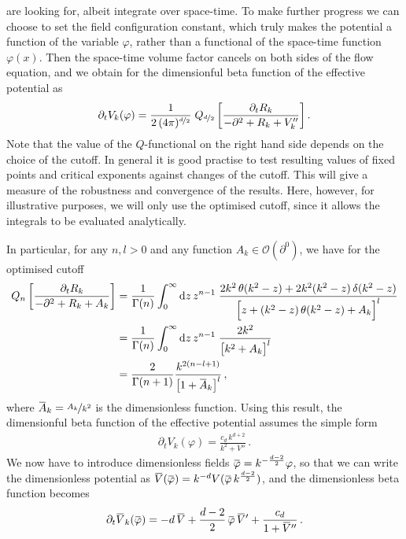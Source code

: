 \documentclass[11pt]{book}
\newcommand{\overbar}[1]{\mkern 1.5mu\overline{\mkern-1.5mu#1\mkern-1.5mu}\mkern 1.5mu}
\newcommand{\bV}{\overbar V}
\newcommand{\bp}{\overbar \varphi}
\numberwithin{equation}{chapter}
\begin{document}
are looking for, albeit integrate over space-time.
To make further progress
we can choose to set the field configuration constant,
which truly makes the potential a function of the variable $\varphi$,
rather than a functional of the space-time function $\varphi(x)$.
Then the space-time volume factor cancels on both sides of the flow
equation, and we obtain for the dimensionful beta function of the
effective potential as
\begin{align}
  \partial_t V_k (\varphi) =
  \frac{1}{ 2 \,(4\pi)^{\nicefrac d2} } \;
  Q_{\nicefrac{d}{2}}
  \left[
    \frac{ \partial_t R_k }{ -\partial^2 + R_k + V_k'' }
  \right] .
\end{align}
Note that the value of the $Q$-functional on the right hand side
depends on the choice of
the cutoff.
In general it is good practise to test resulting values
of fixed points and critical exponents against changes of the cutoff.
This will give a measure of the robustness and convergence of the results.
Here, however, for illustrative purposes,
we will only use the optimised cutoff, since it allows
the integrals to be evaluated analytically.

In particular, for any $n,l>0$ and any function $A_k \in \mathcal O (\partial^0)$,
we have for the optimised cutoff
\begin{align}
  Q_{n}
  \left[
    \frac{ \partial_t R_k }{ -\partial^2 + R_k + A_k }
  \right]
  &=
  \frac{ 1 }{ \Gamma(n) }
  \int_0^\infty \mathrm dz \, z^{n-1} \;
  \frac{ 2 k^2 \, \theta (k^2-z) + 2 k^2 (k^2-z) \, \delta (k^2-z) }
  { \Big[ z + (k^2-z) \, \theta (k^2-z) + A_k \Big]^l } \nonumber \\
  &=
  \frac{ 1 }{ \Gamma(n) }
  \int_0^\infty \mathrm dz \, z^{n-1} \;
  \frac{ 2 k^2 }{ \big[ k^2 + A_k \big] ^ l } \nonumber \\
  &=
  \frac{ 2 }{ \Gamma(n+1) }
  \frac{ k^{2(n-l+1)} }{ \big[ 1 + \overbar A_k \big] ^ l } \,,
  \label{eq:Qfuncoptcutoff}
\end{align}
where $\overbar A_k = \nicefrac{A_k}{k^2}$ is the dimensionless function.
Using this result, the dimensionful beta function of the effective
potential assumes the simple form
\begin{align}
  \partial_t V_k (\varphi) =
  \frac{ c_d \, k^{d+2} }{ k^2 + V'' } \,.
\end{align}
We now have to introduce dimensionless fields
$\bp = k^{ - \frac{d-2}{2} } \varphi$, so that
we can write the dimensionless potential
as $\overbar V(\bp) = k^{-d} V(\bp \, k^{\frac{d-2}{2} })$,
and the dimensionless beta function becomes
\begin{align}
  \partial_t \overbar V_k (\bp) =
  -d \, \bV + \frac{d-2}{2} \, \bp \, \bV' + \frac{ c_d }{ 1 + \overbar V '' } \,.
\end{align}
\end{document}
